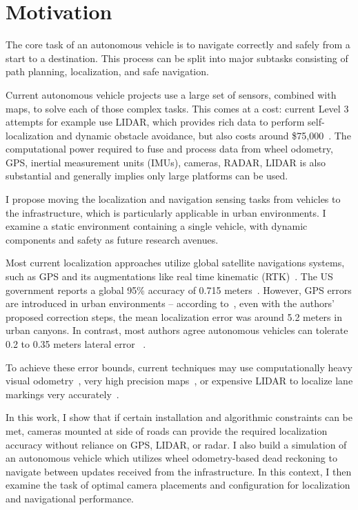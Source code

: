 \documentclass[a4paper,12pt,twoside,openright]{report}
\begin{document}
\section{Motivation}
\label{sec:intro:motivation}

The core task of an autonomous vehicle is to navigate correctly and safely from a start
to a destination. This process can be split into major subtasks consisting
of path planning, localization, and safe navigation.

Current autonomous vehicle projects use a large set of sensors, combined with
maps, to solve each of those complex tasks. This comes at a cost: current
Level 3 attempts for example use LIDAR, which 
provides rich data to perform self-localization and dynamic obstacle avoidance,
but also costs around \$75,000~\cite{lin2018architectural}. The computational
power required to fuse and process data from wheel odometry,
GPS, inertial measurement units (IMUs), cameras, RADAR, LIDAR is also substantial
and generally implies only large platforms can be used.

I propose moving the localization and navigation sensing tasks
from vehicles to the infrastructure, which is particularly applicable in urban environments.
I examine a static environment containing a single vehicle, with dynamic components and safety
as future research avenues.

Most current localization approaches utilize global satellite navigations systems,
such as GPS and its augmentations like real time kinematic (RTK)~\cite{scherzinger2000precise}.
The US government reports a global 95\% accuracy of 0.715 meters~\cite{USGPSPerformance}. 
However, GPS errors are introduced in urban environments -- according to~\citeauthor{miura2015gps}, even with the
authors' proposed correction steps, the mean localization error was around 5.2 meters in urban canyons. 
In contrast, most authors agree autonomous vehicles can tolerate 0.2 to 0.35 meters lateral error
~\cite{vivacqua2017low}\cite{ziegler2014video}\cite{mattern2010high}.

To achieve these error bounds, current techniques may use computationally heavy visual odometry~\cite{ziegler2014video},
very high precision maps~\cite{mattern2010high}, or expensive LIDAR to localize
lane markings very accurately~\cite{hata2014road}.  

In this work, I show that if certain installation and algorithmic constraints
can be met, cameras mounted at side of roads can provide the required localization
accuracy without reliance on GPS, LIDAR, or radar. I also build a simulation
of an autonomous vehicle which utilizes wheel odometry-based dead reckoning 
to navigate between updates received from the infrastructure. In this context,
I then examine the task of optimal camera placements and configuration for localization and navigational performance.
\end{document}
